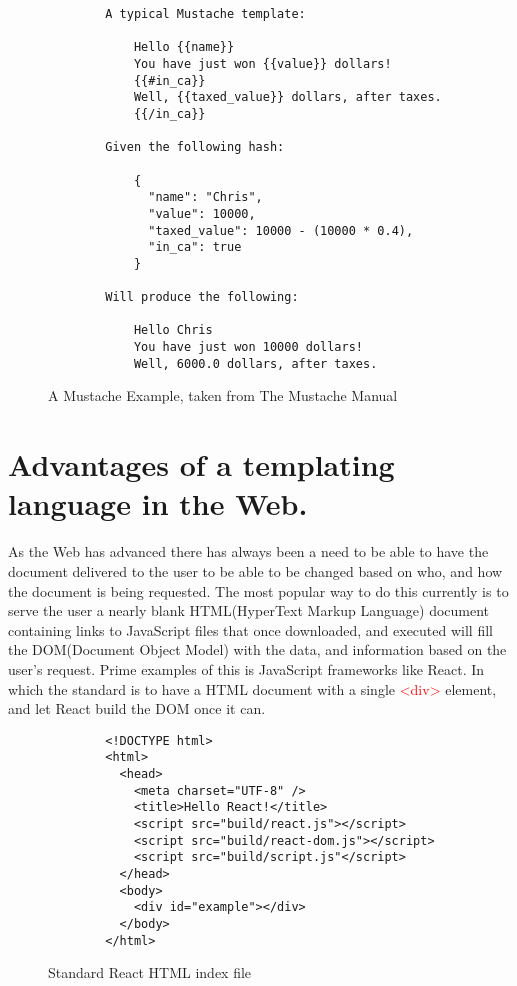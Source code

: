 \begin{figure}[ht!]
    \begin{verbatim}
        A typical Mustache template:

            Hello {{name}}
            You have just won {{value}} dollars!
            {{#in_ca}}
            Well, {{taxed_value}} dollars, after taxes.
            {{/in_ca}}

        Given the following hash:

            {
              "name": "Chris",
              "value": 10000,
              "taxed_value": 10000 - (10000 * 0.4),
              "in_ca": true
            }

        Will produce the following:

            Hello Chris
            You have just won 10000 dollars!
            Well, 6000.0 dollars, after taxes.
    \end{verbatim}
    \caption{A Mustache Example, taken from The Mustache Manual\cite{MustacheMan}}
    \label{fig:mustacheEx}
\end{figure}
\clearpage


\section{Advantages of a templating language in the Web.}
As the Web has advanced there has always been a need to be able to have the document delivered to the user to be able to be changed based on who, and how the document is being requested. The most popular way to do this currently is to serve the user a nearly blank HTML(HyperText Markup Language) document containing links to JavaScript files that once downloaded, and executed will fill the DOM(Document Object Model) with the data, and information based on the user's request. Prime examples of this is JavaScript frameworks like React. In which the standard is to have a HTML document with a single \textcolor{red}{<div>} element, and let React build the DOM once it can.

\begin{figure}[ht!]
    \begin{verbatim}
        <!DOCTYPE html>
        <html>
          <head>
            <meta charset="UTF-8" />
            <title>Hello React!</title>
            <script src="build/react.js"></script>
            <script src="build/react-dom.js"></script>
            <script src="build/script.js"</script>
          </head>
          <body>
            <div id="example"></div>
          </body>
        </html>
    \end{verbatim}
    \caption{Standard React HTML index file}
\end{figure}

